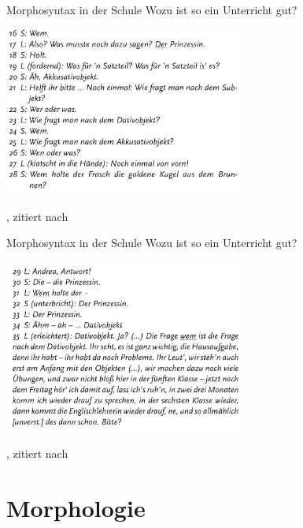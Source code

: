 \begin{frame}
  {Morphosyntax in der Schule}
  Wozu ist so ein Unterricht gut?
  \begin{center}
    \includegraphics[width=0.6\textwidth]{graphics/kasusschule2}
  \end{center}
  \tiny \citet[36--37]{Gramzowemden2002}, zitiert nach \citet[257--258]{Bredel2013}
\end{frame}

\begin{frame}
  {Morphosyntax in der Schule}
  Wozu ist so ein Unterricht gut?
  \begin{center}
    \includegraphics[width=0.6\textwidth]{graphics/kasusschule3}
  \end{center}
  \tiny \citet[36--37]{Gramzowemden2002}, zitiert nach \citet[257--258]{Bredel2013}
\end{frame}

\section{Morphologie}

